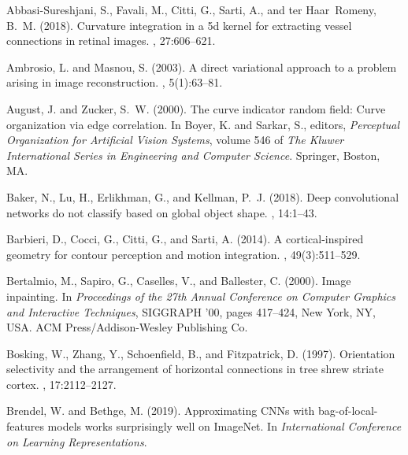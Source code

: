 \documentclass[11pt,oneside,reqno]{amsart}
\begin{document}
 \begin{thebibliography}{}

Abbasi-Sureshjani, S., Favali, M., Citti, G., Sarti, A., and ter Haar~Romeny,
  B.~M. (2018).
\newblock Curvature integration in a 5d kernel for extracting vessel
  connections in retinal images.
, 27:606--621.

Ambrosio, L. and Masnou, S. (2003).
\newblock A direct variational approach to a problem arising in image
  reconstruction.
, 5(1):63--81.

August, J. and Zucker, S.~W. (2000).
\newblock The curve indicator random field: Curve organization via edge
  correlation.
\newblock In Boyer, K. and Sarkar, S., editors, {\em Perceptual Organization
  for Artificial Vision Systems}, volume 546 of {\em The Kluwer International
  Series in Engineering and Computer Science}. Springer, Boston, MA.

Baker, N., Lu, H., Erlikhman, G., and Kellman, P.~J. (2018).
\newblock Deep convolutional networks do not classify based on global object
  shape.
, 14:1--43.

Barbieri, D., Cocci, G., Citti, G., and Sarti, A. (2014).
\newblock A cortical-inspired geometry for contour perception and motion
  integration.
, 49(3):511--529.

Bertalmio, M., Sapiro, G., Caselles, V., and Ballester, C. (2000).
\newblock Image inpainting.
\newblock In {\em Proceedings of the 27th Annual Conference on Computer
  Graphics and Interactive Techniques}, SIGGRAPH '00, pages 417--424, New York,
  NY, USA. ACM Press/Addison-Wesley Publishing Co.

Bosking, W., Zhang, Y., Schoenfield, B., and Fitzpatrick, D. (1997).
\newblock Orientation selectivity and the arrangement of horizontal connections
  in tree shrew striate cortex.
, 17:2112--2127.

Brendel, W. and Bethge, M. (2019).
\newblock Approximating {CNNs} with bag-of-local-features models works
  surprisingly well on {I}mage{N}et.
\newblock In {\em International Conference on Learning Representations}.


\end{thebibliography}
\end{document}
